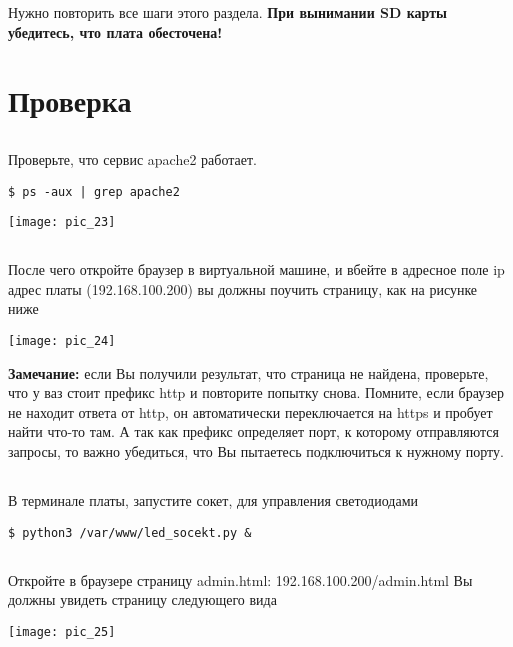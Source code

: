 Нужно повторить все шаги этого раздела. \textbf{При вынимании SD карты убедитесь, что плата обесточена!}

\section{Проверка}

\subsection{}Проверьте, что сервис apache2 работает. 
\begin{lstlisting}[style=bash]
$ ps -aux | grep apache2
\end{lstlisting}
\begin{center}
	\texttt{[image: pic\_23]}
\end{center}

\subsection{}После чего откройте браузер в виртуальной машине, и вбейте в адресное поле ip адрес платы (192.168.100.200) вы должны поучить страницу, как на рисунке ниже
\begin{center}
	\texttt{[image: pic\_24]}
\end{center}
\textbf{Замечание:} если Вы получили результат, что страница не найдена, проверьте, что у ваз стоит префикс http и повторите попытку снова. Помните, если браузер не находит ответа от http, он автоматически переключается на https и пробует найти что-то там. А так как префикс определяет порт, к которому отправляются запросы, то важно убедиться, что Вы пытаетесь подключиться к нужному порту.

\subsection{}В терминале платы, запустите сокет, для управления светодиодами 
\begin{lstlisting}[style=bash]
$ python3 /var/www/led_socekt.py &
\end{lstlisting}

\subsection{}Откройте в браузере страницу admin.html: 192.168.100.200/admin.html
Вы должны увидеть страницу следующего вида
\begin{center}
	\texttt{[image: pic\_25]}
\end{center}

